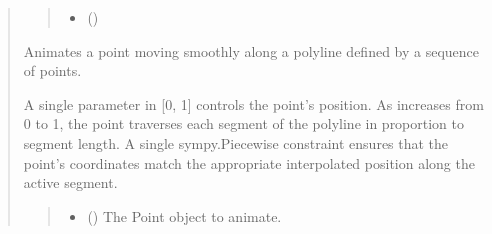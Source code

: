 \documentclass[letterpaper,10pt,english]{sphinxmanual}
\begin{document}
\begin{quote}
\begin{fulllineitems}
\begin{fulllineitems}
\begin{quote}
\begin{description}
\begin{itemize}
\item {} 
\sphinxAtStartPar
{} (\sphinxstyleliteralemphasis{\sphinxupquote{ | }}\sphinxstyleliteralemphasis{\sphinxupquote{ | }}\sphinxstyleliteralemphasis{\sphinxupquote{ | }}\sphinxstyleliteralemphasis{\sphinxupquote{ | }})

\end{itemize}

\end{description}\end{quote}

\end{fulllineitems}


\begin{fulllineitems}
\label{\detokenize{pygeox:pygeox.animate.AnimateNamespace.point_sweep_polyline}}
\pysigstartsignatures
\pysiglinewithargsret
{}
{\sphinxparamcomma {}\sphinxparamcomma {}\sphinxparamcomma {}}
{}
\pysigstopsignatures
\sphinxAtStartPar
Animates a point moving smoothly along a polyline defined by a sequence of points.

\sphinxAtStartPar
A single parameter  in {[}0, 1{]} controls the point’s position.
As  increases from 0 to 1, the point traverses each segment of the polyline
in proportion to segment length. A single sympy.Piecewise constraint ensures that the point’s
coordinates match the appropriate interpolated position along the active segment.
\begin{quote}\begin{description}
\begin{itemize}
\item {} 
\sphinxAtStartPar
{} () \textendash{} The Point object to animate.


\end{itemize}
\end{description}
\end{quote}
\end{fulllineitems}
\end{fulllineitems}
\end{quote}
\end{document}
